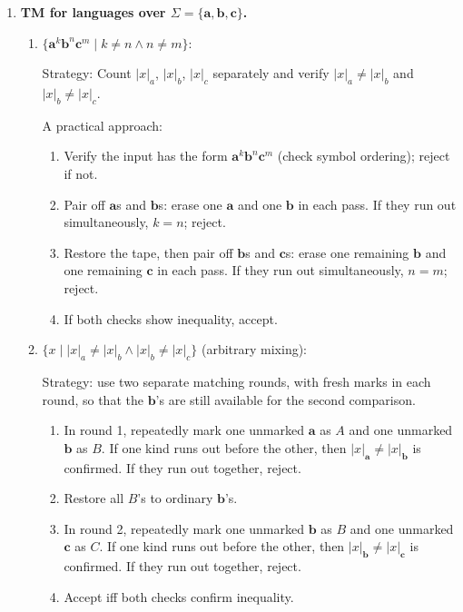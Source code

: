 \begin{enumerate}[{11.}1. ]
The TM maintains the current step $k$ (in unary, using a separate tape region or using a scratch area) and repeats the subtraction of $2k+1$. It accepts when exactly $k^2$ symbols have been processed.

\item \textbf{TM for languages over $\Sigma=\{\pmb{a},\pmb{b},\pmb{c}\}$.}

\begin{enumerate}
\item $\{\pmb{a}^k\pmb{b}^n\pmb{c}^m \mid k\neq n \wedge n\neq m\}$:

Strategy: Count $|x|_a$, $|x|_b$, $|x|_c$ separately and verify $|x|_a \neq |x|_b$ and $|x|_b \neq |x|_c$.

A practical approach:
\begin{enumerate}[1.]
\item Verify the input has the form $\pmb{a}^k\pmb{b}^n\pmb{c}^m$ (check symbol ordering); reject if not.
\item Pair off $\pmb{a}$s and $\pmb{b}$s: erase one $\pmb{a}$ and one $\pmb{b}$ in each pass. If they run out simultaneously, $k=n$; reject.
\item Restore the tape, then pair off $\pmb{b}$s and $\pmb{c}$s: erase one
remaining $\pmb{b}$ and one remaining $\pmb{c}$ in each pass. If they run out
simultaneously, $n=m$; reject.
\item If both checks show inequality, accept.
\end{enumerate}

\item $\{x \mid |x|_a \neq |x|_b \wedge |x|_b \neq |x|_c\}$ (arbitrary mixing):

Strategy: use two separate matching rounds, with fresh marks in each round, so
that the $\pmb{b}$'s are still available for the second comparison.
\begin{enumerate}[1.]
\item In round 1, repeatedly mark one unmarked $\pmb{a}$ as $A$ and one unmarked
$\pmb{b}$ as $B$. If one kind runs out before the other, then
$|x|_{\pmb{a}}\neq |x|_{\pmb{b}}$ is confirmed. If they run out together, reject.
\item Restore all $B$'s to ordinary $\pmb{b}$'s.
\item In round 2, repeatedly mark one unmarked $\pmb{b}$ as $B$ and one
unmarked $\pmb{c}$ as $C$. If one kind runs out before the other, then
$|x|_{\pmb{b}}\neq |x|_{\pmb{c}}$ is confirmed. If they run out together, reject.
\item Accept iff both checks confirm inequality.
\end{enumerate}
\end{enumerate}


\end{enumerate}
